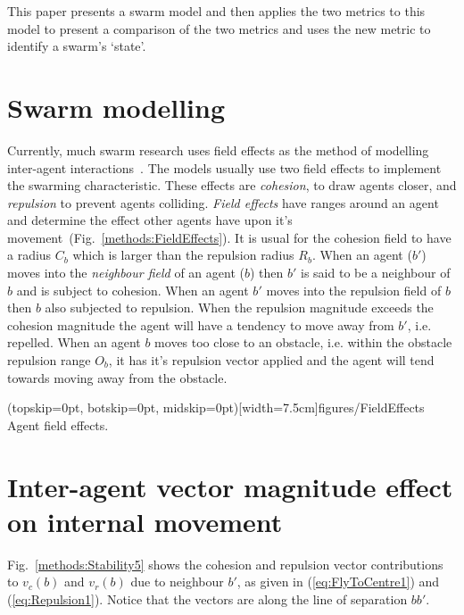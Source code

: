 \documentclass{ieeeaccess}
\begin{document}
This paper presents a swarm model and then applies the two metrics to this model to present a comparison of the two metrics and uses the new metric to identify a swarm's `state'.
 
\section{Swarm modelling}\label{SwarmModelling}
Currently, much swarm research uses field effects as the method of modelling inter-agent interactions~\cite{BAF:06, BAFVM:06, BM:09, APZDAMC:09, GP:02, GP:04, GP:04a, GP:05, GP:11, MYP:09}. The models usually use two field effects to implement the swarming characteristic. These effects are \emph{cohesion}, to draw agents closer, and \emph{repulsion} to prevent agents colliding. \emph{Field effects} have ranges around an agent and determine the effect other agents have upon it's movement~(Fig.~\ref{methods:FieldEffects}). It is usual for the cohesion field to have a radius $C_b$ which is larger than the repulsion radius $R_b$. When an agent ($b'$) moves into the \emph{neighbour field} of an agent ($b$) then $b'$ is said to be a neighbour of $b$ and is subject to cohesion. When an agent $b'$ moves into the repulsion field of $b$ then $b$ also subjected to repulsion. When the repulsion magnitude exceeds the cohesion magnitude the agent will have a tendency to move away from $b'$, i.e. repelled. When an agent $b$ moves too close to an obstacle, i.e. within the obstacle repulsion range $O_b$, it has it's repulsion vector applied and the agent will tend towards moving away from the obstacle.

\Figure[t!](topskip=0pt, botskip=0pt, midskip=0pt)[width=7.5cm]{figures/FieldEffects}
{Agent field effects.\label{methods:FieldEffects}}


\section{Inter-agent vector magnitude effect on internal movement}\label{Section:StabilityMagnitude}
Fig.~\ref{methods:Stability5} shows the cohesion and repulsion vector contributions to $v_c(b)$ and $v_r(b)$ due to neighbour $b'$, as given in (\ref{eq:FlyToCentre1}) and (\ref{eq:Repulsion1}). Notice that the vectors are along the line of separation $bb'$. \\
\end{document}
